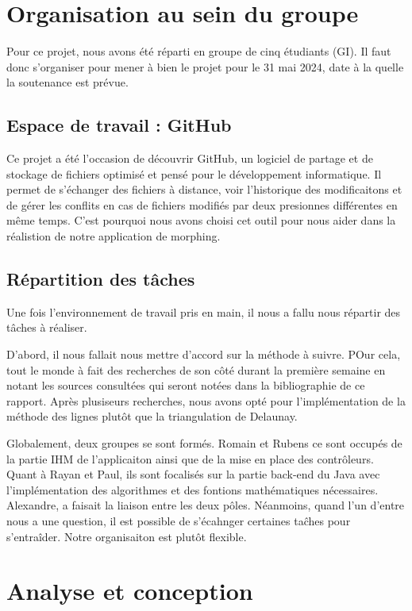 \documentclass[11pt, titlepage]{article}
\begin{document}
\section{Organisation au sein du groupe}

Pour ce projet, nous avons été réparti en groupe de cinq étudiants (GI). Il faut donc s'organiser pour mener à bien le projet pour le 31 mai 2024, date à la quelle la soutenance est prévue.


\subsection{Espace de travail : GitHub}

Ce projet a été l'occasion de découvrir GitHub, un logiciel de partage et de stockage de fichiers optimisé et pensé pour le développement informatique. Il permet de s'échanger des fichiers à distance, voir l'historique des modificaitons et de gérer les conflits en cas de fichiers modifiés par deux presionnes différentes en même temps. C'est pourquoi nous avons choisi cet outil pour nous aider dans la réalistion de notre application de morphing.


\subsection{Répartition des tâches}

Une fois l'environnement de travail pris en main, il nous a fallu nous répartir des tâches à réaliser.

D'abord, il nous fallait nous mettre d'accord sur la méthode à suivre. POur cela, tout le monde à fait des recherches de son côté durant la première semaine en notant les sources consultées qui seront notées dans la bibliographie de ce rapport. Après plusiseurs recherches, nous avons opté pour l'implémentation de la méthode des lignes plutôt que la triangulation de Delaunay.

Globalement, deux groupes se sont formés. Romain et Rubens ce sont occupés de la partie IHM de l'applicaiton ainsi que de la mise en place des contrôleurs. Quant à Rayan et Paul, ils sont focalisés sur la partie back-end du Java avec l'implémentation des algorithmes et des fontions mathématiques nécessaires. Alexandre, a faisait la liaison entre les deux pôles. Néanmoins, quand l'un d'entre nous a une question, il est possible de s'écahnger certaines taĉhes pour s'entraîder. Notre organisaiton est plutôt flexible.


\section{Analyse et conception}
\end{document}

